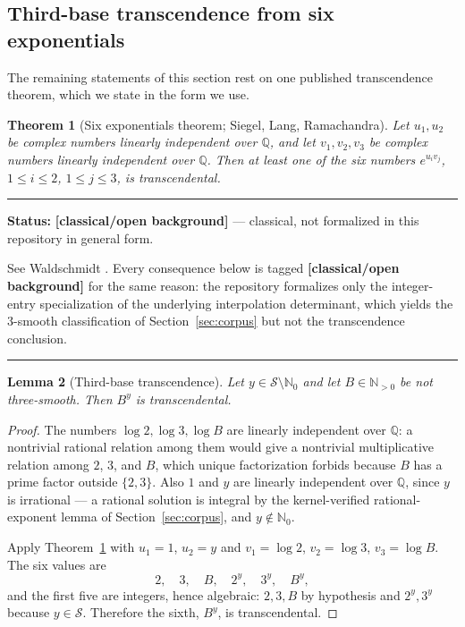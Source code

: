 \documentclass[11pt,oneside]{article}
\newtheorem{theorem}{Theorem}[section]
\newtheorem{lemma}[theorem]{Lemma}
\theoremstyle{definition}
\theoremstyle{remark}
\newcommand{\N}{\mathbb N}
\newcommand{\Nzero}{\mathbb N_0}
\newcommand{\Q}{\mathbb Q}
\newcommand{\Sol}{\mathcal S}
\newcommand{\statusknown}{\textcolor{classicalgray}{\textbf{[classical/open background]}}}
\newenvironment{statusbox}[1]
{\begin{center}\begin{minipage}{0.94\textwidth}\raggedright\hbadness=10000\hrule
\vspace{0.45em}\textbf{Status:} #1\par\vspace{0.35em}}
{\vspace{0.35em}\hrule\end{minipage}\end{center}}
\begin{document}
\subsection{Third-base transcendence from six exponentials}

The remaining statements of this section rest on one published transcendence theorem, which
we state in the form we use.

\begin{theorem}[Six exponentials theorem; Siegel, Lang, Ramachandra]
\label{sm:six-exp}
Let $u_1,u_2$ be complex numbers linearly independent over $\Q$, and let $v_1,v_2,v_3$ be
complex numbers linearly independent over $\Q$.  Then at least one of the six numbers
$e^{u_iv_j}$, $1\le i\le2$, $1\le j\le3$, is transcendental.
\end{theorem}

\begin{statusbox}{\statusknown{} --- classical, not formalized in this repository in general
form.}
See Waldschmidt \cite{Waldschmidt2000,Waldschmidt2005}.  Every consequence below is tagged
\statusknown{} for the same reason: the repository formalizes only the integer-entry
specialization of the underlying interpolation determinant, which yields the $3$-smooth
classification of Section~\ref{sec:corpus} but not the transcendence conclusion.
\end{statusbox}

\begin{lemma}[Third-base transcendence]
\label{sm:third-base-trans}
Let $y\in\Sol\setminus\Nzero$ and let $B\in\N_{>0}$ be not three-smooth.  Then $B^y$ is
transcendental.
\end{lemma}

\begin{proof}
The numbers $\log2,\log3,\log B$ are linearly independent over $\Q$: a nontrivial rational
relation among them would give a nontrivial multiplicative relation among $2$, $3$, and $B$,
which unique factorization forbids because $B$ has a prime factor outside $\{2,3\}$.  Also
$1$ and $y$ are linearly independent over $\Q$, since $y$ is irrational --- a rational
solution is integral by the kernel-verified rational-exponent lemma of
Section~\ref{sec:corpus}, and $y\notin\Nzero$.

Apply Theorem~\ref{sm:six-exp} with $u_1=1$, $u_2=y$ and $v_1=\log2$, $v_2=\log3$,
$v_3=\log B$.  The six values are
\[
 2,\quad 3,\quad B,\quad 2^y,\quad 3^y,\quad B^y,
\]
and the first five are integers, hence algebraic: $2,3,B$ by hypothesis and $2^y,3^y$
because $y\in\Sol$.  Therefore the sixth, $B^y$, is transcendental.
\end{proof}
\end{document}

